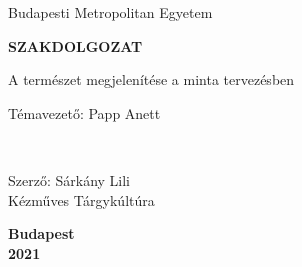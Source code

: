 \begin{titlepage}
    \begin{center}

        \Large
        Budapesti Metropolitan Egyetem
        \vfill

        \Huge
        \textbf{SZAKDOLGOZAT}
 
        \large
        \vspace{10 mm}
        A természet megjelenítése a minta tervezésben
             
 
        \vfill
             

        \begin{minipage}{0.4\textwidth}
            \begin{flushleft}
                \large
                Témavezető: Papp Anett \\ 
            \end{flushleft}
        \end{minipage}
        ~
        \begin{minipage}{0.4\textwidth}
            \begin{flushright}
                \large
                Szerző: Sárkány Lili \\ Kézműves Tárgykúltúra
            \end{flushright}
        \end{minipage}

        \vspace{3 cm}
      
             
        \textbf{Budapest}\\
        \textbf{2021}
        \vspace{5 mm}
             
    \end{center}
 \end{titlepage}